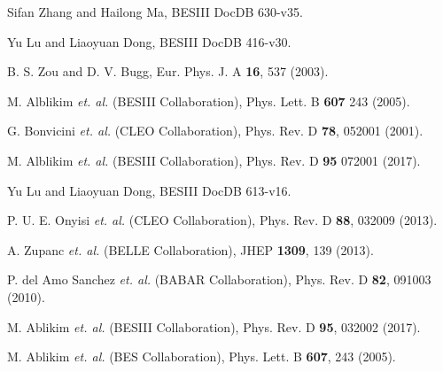 \begin{thebibliography}{99}
Sifan Zhang and Hailong Ma, 
BESIII DocDB 630-v35.

Yu Lu and Liaoyuan Dong, 
BESIII DocDB 416-v30.

B. S. Zou and D. V. Bugg, 
Eur. Phys. J. A \textbf{16}, 537 (2003).

M. Alblikim {\it et. al.}  (BESIII Collaboration),
Phys. Lett. B \textbf{607} 243 (2005).

G. Bonvicini {\it et. al.}  (CLEO Collaboration),
Phys. Rev. D \textbf{78}, 052001 (2001).

M. Alblikim {\it et. al.}  (BESIII Collaboration),
Phys. Rev. D \textbf{95} 072001 (2017).


Yu Lu and Liaoyuan Dong, 
BESIII DocDB 613-v16.

P. U. E. Onyisi {\it et. al.}  (CLEO Collaboration),
Phys. Rev. D \textbf{88}, 032009 (2013).

A. Zupanc {\it et. al.}  (BELLE Collaboration),
JHEP \textbf{1309}, 139 (2013).

P. del Amo Sanchez {\it et. al.}  (BABAR Collaboration),
Phys. Rev. D \textbf{82}, 091003 (2010).

M. Ablikim {\it et. al.} (BESIII Collaboration),
Phys. Rev. D \textbf{95}, 032002 (2017).

    M. Ablikim {\it et. al.} (BES Collaboration),
    Phys. Lett. B \textbf{607}, 243 (2005).


\end{thebibliography}

